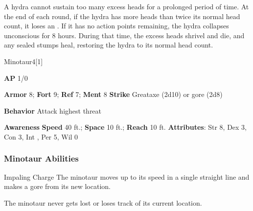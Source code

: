 A hydra cannot sustain too many excess heads for a prolonged period of time.
At the end of each round, if the hydra has more heads than twice its normal head count, it loses an .
If it has no action points remaining, the hydra collapses unconscious for 8 hours.
During that time, the excess heads shrivel and die, and any sealed stumps heal, restoring the hydra to its normal head count.

\begin{monsection}{Minotaur}{4}[1]
\vspace{-1em}\vspace{-1em}
\begin{spellcontent}
\begin{spelltargetinginfo}
{\textbf{AP} 1/0}

\pari \textbf{Armor} 8;
\textbf{Fort} 9;
\textbf{Ref} 7;
\textbf{Ment} 8
\pari \textbf{Strike} Greataxe  (2d10) or gore  (2d8)



\pari \textbf{Behavior} Attack highest threat
\end{spelltargetinginfo}
\end{spellcontent}

\begin{monsterfooter}
\pari \textbf{Awareness} 
\pari \textbf{Speed} 40 ft.;
\textbf{Space} 10 ft.;
\textbf{Reach} 10 ft.
\pari \textbf{Attributes}:
Str 8,
Dex 3,
Con 3,
Int ,
Per 5,
Wil 0
\end{monsterfooter}
\end{monsection}


\subsubsection{Minotaur Abilities}

\begin{freeability}{Impaling Charge}
The minotaur moves up to its speed in a single straight line and makes a gore  from its new location.
\end{freeability}

The minotaur never gets lost or loses track of its current location.

